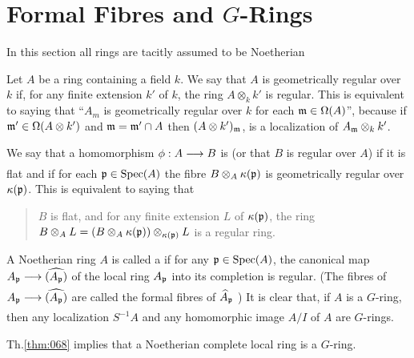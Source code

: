 \documentclass[../main]{subfiles}
\begin{document}
\section{Formal Fibres and \texorpdfstring{$G$}{G}-Rings}\label{sec:33}

\newparagraph In this section all rings are tacitly assumed to be Noetherian

\begin{definition} Let $A$ be a ring containing a field $k$. We say that $A$ is geometrically regular over $k$ if, for any finite extension $k'$ of $k$, the ring $A \otimes_k k'$ is regular. This is equivalent to saying that ``$A_m$ is geometrically regular over $k$ for each $\mathfrak{m} \in \Omega(A)$'', because if $\mathfrak{m}' \in \Omega(A \otimes k')$ and $\mathfrak{m}=\mathfrak{m}' \cap A$ then $(A \otimes k')_{\mathfrak{m}}$, is a localization of $A_{\mathfrak{m}} \otimes_k k'$.
\end{definition}

We say that a homomorphism $\phi: A \varrightarrow{} B$ is  (or that $B$ is regular over $A$) if it is flat and if for each $\mathfrak{p} \in\operatorname{Spec}(A)$ the fibre $B \otimes_A \kappa(\mathfrak{p})$ is geometrically regular over $\kappa(\mathfrak{p})$. This is equivalent to saying that

\begin{quote}
$B$ is flat, and for any finite extension $L$ of $\kappa(\mathfrak{p})$, the ring $B \otimes_A L=(B \otimes_A \kappa(\mathfrak{p})) \otimes_{\kappa(\mathfrak{p})} L$ is a regular ring. 
\end{quote}


A Noetherian ring $A$ is called a  if for any $\mathfrak{p} \in \operatorname{Spec}(A)$, the canonical map $A_\ideal{p} \varrightarrow{}\completion{(A_\ideal{p})}$ of the local ring $A_{\mathfrak{p}}$ into its completion is regular. (The fibres of $A_{\ideal{p}} \varrightarrow{}\completion{(A_\ideal{p})}$ are called the formal fibres of $\widehat{A}_{\mathfrak{p}}$ ) It is clear that, if $A$ is a $G$-ring, then any localization $S^{-1} A$ and any homomorphic image $A/I$ of $A$ are $G$-rings.

Th.\ref{thm:068} implies that a Noetherian complete local ring is a $G$-ring.
\end{document}
